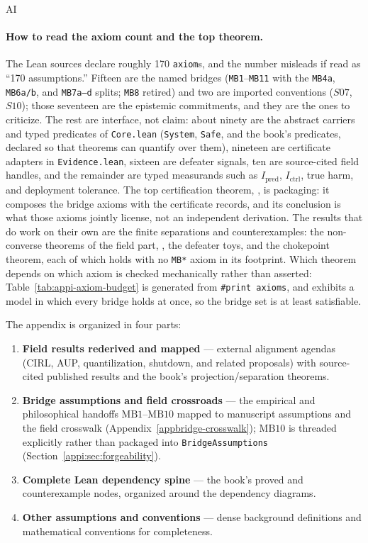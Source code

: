 \begin{authbar}{AI}
\paragraph{How to read the axiom count and the top theorem.}
The Lean sources declare roughly 170 \texttt{axiom}s, and the number misleads if read as ``170 assumptions.''
Fifteen are the named bridges (\texttt{MB1}--\texttt{MB11} with the \texttt{MB4a}, \texttt{MB6a/b}, and \texttt{MB7a--d} splits; \texttt{MB8} retired) and two are imported conventions (\(S07\), \(S10\)); those seventeen are the epistemic commitments, and they are the ones to criticize.
The rest are interface, not claim: about ninety are the abstract carriers and typed predicates of \texttt{Core.lean} (\texttt{System}, \texttt{Safe}, and the book's predicates, declared so that theorems can quantify over them), nineteen are certificate adapters in \texttt{Evidence.lean}, sixteen are defeater signals, ten are source-cited field handles, and the remainder are typed measurands such as \(I_{\text{pred}}\), \(I_{\text{ctrl}}\), true harm, and deployment tolerance.
The top certification theorem, , is packaging: it composes the bridge axioms with the certificate records, and its conclusion is what those axioms jointly license, not an independent derivation.
The results that do work on their own are the finite separations and counterexamples: the non-converse theorems of the field part, , the defeater toys, and the chokepoint theorem, each of which holds with no \texttt{MB*} axiom in its footprint.
Which theorem depends on which axiom is checked mechanically rather than asserted: Table~\ref{tab:appi-axiom-budget} is generated from \texttt{\#print axioms}, and  exhibits a model in which every bridge holds at once, so the bridge set is at least satisfiable.

The appendix is organized in four parts:
\begin{enumerate}
\item \textbf{Field results rederived and mapped} --- external alignment agendas (CIRL, AUP, quantilization, shutdown, and related proposals) with source-cited published results and the book's projection/separation theorems.
\item \textbf{Bridge assumptions and field crossroads} --- the empirical and philosophical handoffs \(\text{MB1}\)--\(\text{MB10}\) mapped to manuscript assumptions and the field crosswalk (Appendix~\ref{appbridge-crosswalk}); \(\text{MB10}\) is threaded explicitly rather than packaged into \texttt{BridgeAssumptions} (Section~\ref{appi:sec:forgeability}).
\item \textbf{Complete Lean dependency spine} --- the book's proved and counterexample nodes, organized around the dependency diagrams.
\item \textbf{Other assumptions and conventions} --- dense background definitions and mathematical conventions for completeness.
\end{enumerate}


\end{authbar}
